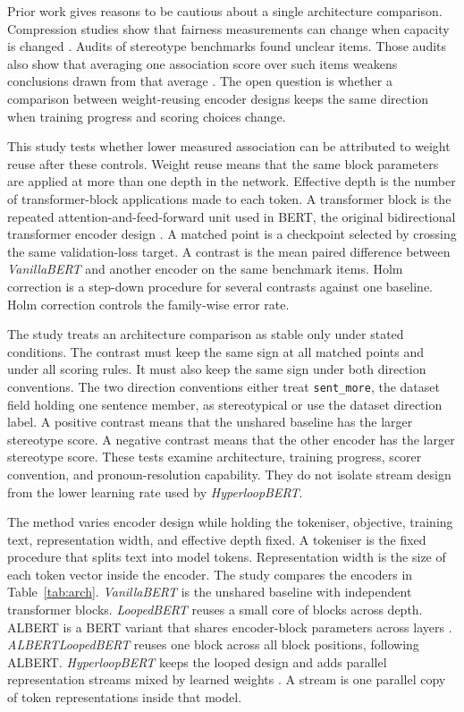\documentclass[sigconf,natbib=true,anonymous=true]{acmart}
\begin{document}
Prior work gives reasons to be cautious about a single architecture comparison.
Compression studies show that fairness measurements can change when capacity is
changed \citep{hooker2020characterising,xu2022compression,ramesh2023comparative}.
Audits of stereotype benchmarks found unclear items. Those audits also show that
averaging one association score over such items weakens conclusions drawn from
that average \citep{blodgett2021salmon,wang2025difference}. The open question is
whether a comparison between weight-reusing encoder designs keeps the same
direction when training progress and scoring choices change.

This study tests whether lower measured association can be attributed to weight
reuse after these controls. Weight reuse means that the same block parameters
are applied at more than one depth in the network. Effective depth is the number
of transformer-block applications made to each token. A transformer block is the
repeated attention-and-feed-forward unit used in BERT, the original
bidirectional transformer encoder design \citep{devlin2019bert}. A matched point
is a checkpoint selected by crossing the same validation-loss target. A contrast
is the mean paired difference between \emph{VanillaBERT} and another encoder on
the same benchmark items. Holm correction is a step-down procedure for several
contrasts against one baseline. Holm correction controls the family-wise error
rate.

The study treats an architecture comparison as stable only under stated
conditions. The contrast must keep the same sign at all matched points and under
all scoring rules. It must also keep the same sign under both direction
conventions. The two direction conventions either treat \texttt{sent\_more}, the
dataset field holding one sentence member, as stereotypical or use the dataset
direction label. A positive contrast means that the unshared baseline has the
larger stereotype score. A negative contrast means that the other encoder has
the larger stereotype score. These tests examine architecture, training
progress, scorer convention, and pronoun-resolution capability. They do not
isolate stream design from the lower learning rate used by \emph{HyperloopBERT}.

The method varies encoder design while holding the tokeniser, objective,
training text, representation width, and effective depth fixed. A tokeniser is
the fixed procedure that splits text into model tokens. Representation width is
the size of each token vector inside the encoder. The study compares the
encoders in Table~\ref{tab:arch}. \emph{VanillaBERT} is the unshared baseline
with independent transformer blocks. \emph{LoopedBERT} reuses a small core of
blocks across depth. ALBERT is a BERT variant that shares encoder-block
parameters across layers \citep{lan2020albert}. \emph{ALBERTLoopedBERT} reuses
one block across all block positions, following ALBERT. \emph{HyperloopBERT}
keeps the looped design and adds parallel representation streams mixed by
learned weights \citep{zhu2025hyperconnections}. A stream is one parallel copy
of token representations inside that model.
\end{document}
